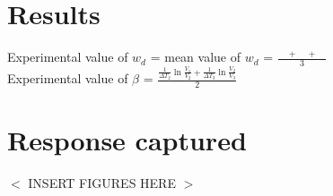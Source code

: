 \documentclass[a4paper,12pt]{article}
\begin{document}
\section{Results}
Experimental value of $w_d$ = mean value of $w_d$  = $\frac{\quad + \quad  + \quad }{3}$\\
Experimental value of $\beta$ = $\frac{\frac{1}{\Delta T_2}\ln{\frac{V_1}{V_2}}  
+ \frac{1}{\Delta T_3}\ln{\frac{V_2}{V_3}}}{2}$\\
\section{Response captured}
$<$ INSERT FIGURES HERE $>$
\end{document}

